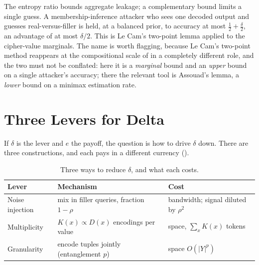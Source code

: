 \begin{remark}
\label{rem:le-cam-marginal}
The entropy ratio bounds aggregate leakage; a complementary bound limits a
single guess. A membership-inference attacker who sees one decoded output
and guesses real-versus-filler is held, at a balanced prior, to accuracy at
most $\tfrac12 + \tfrac\delta2$, an advantage of at most $\delta/2$. This is
Le Cam's two-point lemma applied to the cipher-value marginals. The name is
worth flagging, because Le Cam's two-point method reappears at the
compositional scale of  in a completely
different role, and the two must not be conflated: here it is a
\emph{marginal} bound and an \emph{upper} bound on a single attacker's
accuracy; there the relevant tool is Assouad's lemma, a \emph{lower} bound
on a minimax estimation rate.
\end{remark}

\section{Three Levers for Delta}
\label{sec:delta-levers}

If $\delta$ is the lever and $e$ the payoff, the question is how to drive
$\delta$ down. There are three constructions, and each pays in a different
currency ().

\begin{table}[t]
\centering
\caption{Three ways to reduce $\delta$, and what each costs.}
\label{tab:levers}
\begin{tabular}{@{}lll@{}}
\toprule
Lever & Mechanism & Cost \\
\midrule
Noise injection & mix in filler queries, fraction $1-\rho$ & bandwidth; signal diluted by $\rho^2$ \\
Multiplicity & $K(x) \propto D(x)$ encodings per value & space, $\sum_x K(x)$ tokens \\
Granularity & encode tuples jointly (entanglement $p$) & space $O(\lvert Y\rvert^{p})$ \\
\bottomrule
\end{tabular}
\end{table}

